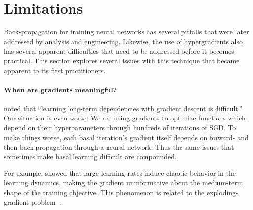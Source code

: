 \documentclass{article}
\newcommand{\primal}{basal }
\begin{document}
\section{Limitations}

Back-propagation for training neural networks has several pitfalls that were later addressed by analysis and engineering.
Likewise, the use of hypergradients also has several apparent difficulties that need to be addressed before it becomes practical.
This section explores several issues with this technique that became apparent to its first practitioners.

\paragraph{When are gradients meaningful?}
\citet{bengio1994learning} noted that ``learning long-term dependencies with gradient descent is difficult.''
Our situation is even worse: We are using gradients to optimize functions which depend on their hyperparameters through hundreds of iterations of SGD.
To make things worse, each \primal{} iteration's gradient itself depends on forward- and then back-propagation through a neural network.
Thus the same issues that sometimes make \primal{} learning difficult are compounded.


For example, \citet*[Chapter 4]{pearlmutter1996investigation} showed that 
large learning rates induce chaotic behavior in the learning dynamics,
making the gradient uninformative about the medium-term shape of the training objective.
This phenomenon is related to the exploding-gradient problem~\cite{pascanu2012understanding}.
\end{document}
